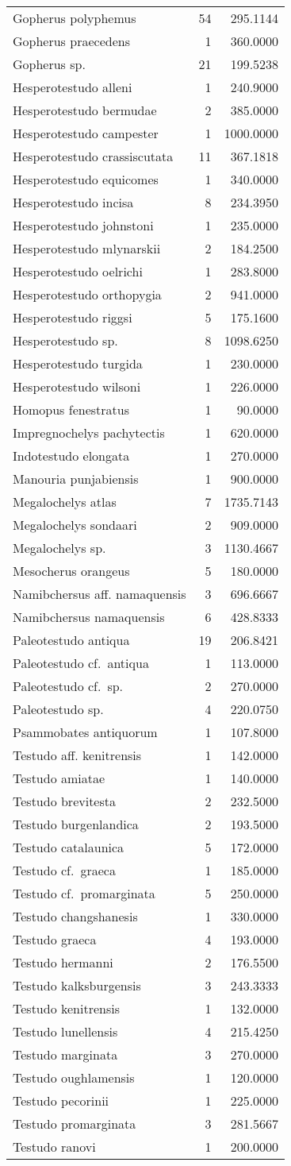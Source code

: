 \begin{longtable}[]{@{}lrr@{}}
	Gopherus polyphemus & 54 & 295.1144\tabularnewline
	Gopherus praecedens & 1 & 360.0000\tabularnewline
	Gopherus sp. & 21 & 199.5238\tabularnewline
	Hesperotestudo alleni & 1 & 240.9000\tabularnewline
	Hesperotestudo bermudae & 2 & 385.0000\tabularnewline
	Hesperotestudo campester & 1 & 1000.0000\tabularnewline
	Hesperotestudo crassiscutata & 11 & 367.1818\tabularnewline
	Hesperotestudo equicomes & 1 & 340.0000\tabularnewline
	Hesperotestudo incisa & 8 & 234.3950\tabularnewline
	Hesperotestudo johnstoni & 1 & 235.0000\tabularnewline
	Hesperotestudo mlynarskii & 2 & 184.2500\tabularnewline
	Hesperotestudo oelrichi & 1 & 283.8000\tabularnewline
	Hesperotestudo orthopygia & 2 & 941.0000\tabularnewline
	Hesperotestudo riggsi & 5 & 175.1600\tabularnewline
	Hesperotestudo sp. & 8 & 1098.6250\tabularnewline
	Hesperotestudo turgida & 1 & 230.0000\tabularnewline
	Hesperotestudo wilsoni & 1 & 226.0000\tabularnewline
	Homopus fenestratus & 1 & 90.0000\tabularnewline
	Impregnochelys pachytectis & 1 & 620.0000\tabularnewline
	Indotestudo elongata & 1 & 270.0000\tabularnewline
	Manouria punjabiensis & 1 & 900.0000\tabularnewline
	Megalochelys atlas & 7 & 1735.7143\tabularnewline
	Megalochelys sondaari & 2 & 909.0000\tabularnewline
	Megalochelys sp. & 3 & 1130.4667\tabularnewline
	Mesocherus orangeus & 5 & 180.0000\tabularnewline
	Namibchersus aff. namaquensis & 3 & 696.6667\tabularnewline
	Namibchersus namaquensis & 6 & 428.8333\tabularnewline
	Paleotestudo antiqua & 19 & 206.8421\tabularnewline
	Paleotestudo cf.~antiqua & 1 & 113.0000\tabularnewline
	Paleotestudo cf.~sp. & 2 & 270.0000\tabularnewline
	Paleotestudo sp. & 4 & 220.0750\tabularnewline
	Psammobates antiquorum & 1 & 107.8000\tabularnewline
	Testudo aff. kenitrensis & 1 & 142.0000\tabularnewline
	Testudo amiatae & 1 & 140.0000\tabularnewline
	Testudo brevitesta & 2 & 232.5000\tabularnewline
	Testudo burgenlandica & 2 & 193.5000\tabularnewline
	Testudo catalaunica & 5 & 172.0000\tabularnewline
	Testudo cf.~graeca & 1 & 185.0000\tabularnewline
	Testudo cf.~promarginata & 5 & 250.0000\tabularnewline
	Testudo changshanesis & 1 & 330.0000\tabularnewline
	Testudo graeca & 4 & 193.0000\tabularnewline
	Testudo hermanni & 2 & 176.5500\tabularnewline
	Testudo kalksburgensis & 3 & 243.3333\tabularnewline
	Testudo kenitrensis & 1 & 132.0000\tabularnewline
	Testudo lunellensis & 4 & 215.4250\tabularnewline
	Testudo marginata & 3 & 270.0000\tabularnewline
	Testudo oughlamensis & 1 & 120.0000\tabularnewline
	Testudo pecorinii & 1 & 225.0000\tabularnewline
	Testudo promarginata & 3 & 281.5667\tabularnewline
	Testudo ranovi & 1 & 200.0000\tabularnewline

\end{longtable}

